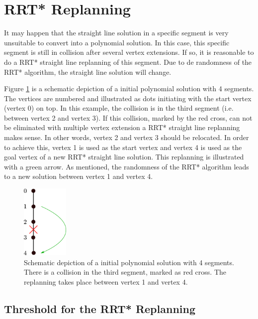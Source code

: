 \section{RRT* Replanning}\label{sec:replanningPassages}

It may happen that the straight line solution in a specific segment is very unsuitable to convert into a polynomial solution. In this case, this specific segment is still in collision after several vertex extensions. If so, it is reasonable to do a RRT* straight line replanning of this segment. Due to de randomness of the RRT* algorithm, the straight line solution will change. \newline

Figure \ref{pic:vertexExtensionRRT} is a schematic depiction of a initial polynomial solution with 4 segments. The vertices are numbered and illustrated as dots initiating with the start vertex (vertex 0) on top. In this example, the collision is in the third segment (i.e. between vertex 2 and vertex 3). If this collision, marked by the red cross, can not be eliminated with multiple vertex extension a RRT* straight line replanning makes sense. In other words, vertex 2 and vertex 3 should be relocated. 
In order to achieve this, vertex 1 is used as the start vertex and vertex 4 is used as the goal vertex of a new RRT* straight line solution. This replanning is illustrated with a green arrow. As mentioned, the randomness of the RRT* algorithm leads to a new solution between vertex 1 and vertex 4.


\begin{figure}[h]
   \centering
   \includegraphics[width=0.2\textwidth]{pics/vertexExtensionRRT.eps}
   \caption{Schematic depiction of a initial polynomial solution with 4 segments. There is a collision in the third segment, marked as red cross. The replanning takes place between vertex 1 and vertex 4.}
   \label{pic:vertexExtensionRRT}
\end{figure}


\subsection{Threshold for the RRT* Replanning}\label{sec:RRTreplanning}

